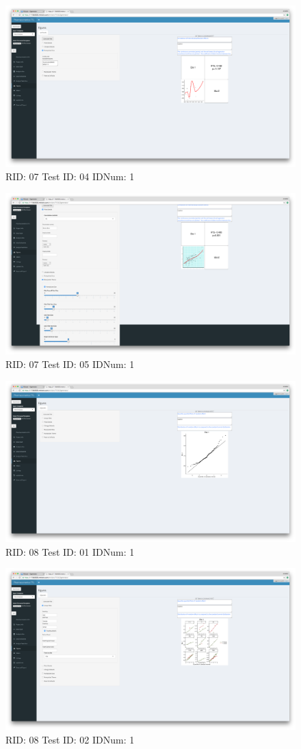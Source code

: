 \begin{figure}[H]
\includegraphics[width=.8\textwidth]{screencaps/07-04-1.png}
\caption{RID: 07 Test ID: 04 IDNum: 1}
\end{figure}
\begin{figure}[H]
\includegraphics[width=.8\textwidth]{screencaps/07-05-1.png}
\caption{RID: 07 Test ID: 05 IDNum: 1}
\end{figure}
\begin{figure}[H]
\includegraphics[width=.8\textwidth]{screencaps/08-01-1.png}
\caption{RID: 08 Test ID: 01 IDNum: 1}
\end{figure}
\begin{figure}[H]
\includegraphics[width=.8\textwidth]{screencaps/08-02-1.png}
\caption{RID: 08 Test ID: 02 IDNum: 1}
\end{figure}
